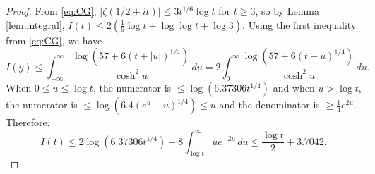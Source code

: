 \documentclass[10pt]{amsart}
\theoremstyle{remark}
\theoremstyle{plain}
\numberwithin{equation}{section}
\theoremstyle{definition}
\begin{document}
\begin{proof}
From \eqref{eq:CG}, $|\zeta(1/2+it)| \le 3t^{1/6}\log t$ for $t\ge 3$, so by
Lemma \ref{lem:integral}, $I(t) \le 2(\frac16 \log t + \log\log t +\log 3)$.
Using the first inequality from \eqref{eq:CG}, we have
\begin{equation*}
I(y) \le \int_{-\infty}^\infty \frac{\log(57+6(t+|u|)^{1/4})}{\cosh^2 u}\,
du = 2\int_0^\infty  \frac{\log(57+6(t+u)^{1/4})}{\cosh^2 u}\, du.
\end{equation*}
When $0\le u \le \log t$, the numerator is $\le \log(6.37306t^{1/4})$ and
when $u>\log t$, the numerator is $\le \log(6.4(e^u+u)^{1/4}) \le u$ and
the denominator is $\ge \frac14 e^{2u}$.  Therefore,
\begin{equation*}
I(t) \le 2\log(6.37306t^{1/4})+8\int_{\log t}^\infty ue^{-2u}\, du \le
\frac{\log t}{2}+3.7042.
\end{equation*}
\end{proof}
\end{document}
